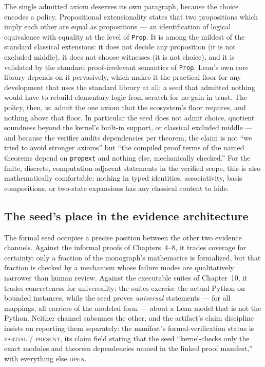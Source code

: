 The single admitted axiom deserves its own paragraph, because the choice
encodes a policy. Propositional extensionality states that two
propositions which imply each other are equal as propositions --- an
identification of logical equivalence with equality at the level of
\texttt{Prop}. It is among the mildest of the standard classical
extensions: it does not decide any proposition (it is not excluded
middle), it does not choose witnesses (it is not choice), and it is
validated by the standard proof-irrelevant semantics of \texttt{Prop}.
Lean's own core library depends on it pervasively, which makes it the
practical floor for any development that uses the standard library at
all; a seed that admitted nothing would have to rebuild elementary
logic from scratch for no gain in trust. The policy, then, is: admit
the one axiom that the ecosystem's floor requires, and nothing above
that floor. In particular the seed does not admit choice, quotient
soundness beyond the kernel's built-in support, or classical excluded
middle --- and because the verifier audits dependencies per theorem,
the claim is not ``we tried to avoid stronger axioms'' but ``the
compiled proof terms of the named theorems depend on \texttt{propext}
and nothing else, mechanically checked.'' For the finite, discrete,
computation-adjacent statements in the verified scope, this is also
mathematically comfortable: nothing in typed identities,
associativity, basis compositions, or two-state expansions has any
classical content to hide.

\subsection{The seed's place in the evidence architecture}

The formal seed occupies a precise position between the other two evidence
channels. Against the informal proofs of Chapters~4--8, it trades
coverage for certainty: only a fraction of the monograph's mathematics is
formalized, but that fraction is checked by a mechanism whose failure
modes are qualitatively narrower than human review. Against the
executable suites of Chapter~10, it trades concreteness for universality:
the suites exercise the actual Python on bounded instances, while the
seed proves \emph{universal} statements --- for all mappings, all
carriers of the modeled form --- about a Lean model that is not the
Python. Neither channel subsumes the other, and the artifact's claim
discipline insists on reporting them separately: the manifest's
formal-verification status is \textsc{partial / present}, its claim field
stating that the seed ``kernel-checks only the exact modules and theorem
dependencies named in the linked proof manifest,'' with everything else
\textsc{open}.

